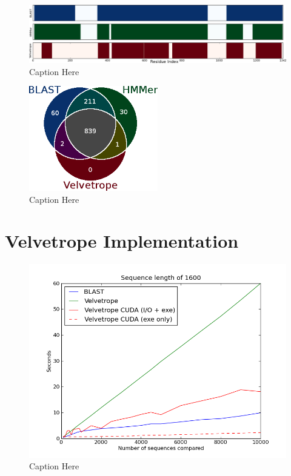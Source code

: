 \documentclass[phd,tocprelim]{cornell}
\begin{document}
\begin{figure}[htp]%
 \centerline{\includegraphics[width=\textwidth]{figures/velvetrope/compare6.png}}
 \caption[Velvetrope vs. HMMer and BLAST]{Caption Here}
 	\label{VRcompare1}
 \end{figure}

 \begin{figure}[htp]%
 \centerline{\includegraphics[width=0.5\textwidth]{figures/velvetrope/compare5.png}}
 \caption[Comparison Venn diagram]{Caption Here}
 	\label{VRcompare2}
 \end{figure}



\chapter{Velvetrope Implementation} %
\label{cha:Velvetrope Implementation}

\begin{figure}[htp]%
 \centerline{\includegraphics[width=\textwidth]{figures/velvetrope/timersSC.png}}
 \caption[Velvetrope timings]{Caption Here}
 	\label{fig:vr06}
 \end{figure}
\end{document}
